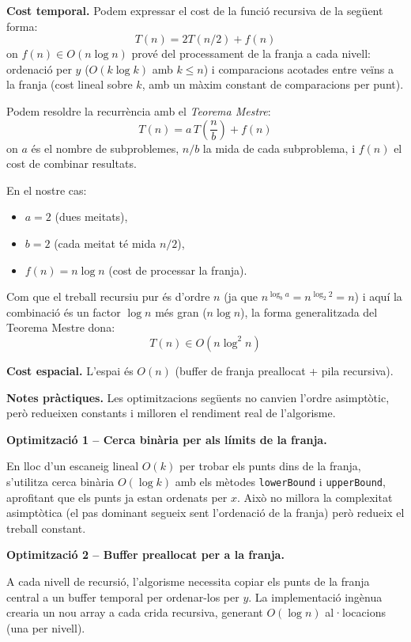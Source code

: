 \documentclass[conference,compsoc]{IEEEtran}
\begin{document}
\textbf{Cost temporal.}
Podem expressar el cost de la funció recursiva de la següent forma:
\begin{equation}
T(n)=2T(n/2)+f(n)
\end{equation}
on $f(n) \in O(n\log n)$ prové del processament de la franja a cada nivell:
ordenació per $y$ ($O(k\log k)$ amb $k \leq n$) i comparacions acotades entre veïns
a la franja (cost lineal sobre $k$, amb un màxim constant de comparacions
per punt).

Podem resoldre la recurrència amb el \textit{Teorema Mestre}:
\[
T(n)=a\,T\!\left(\frac{n}{b}\right)+f(n)
\]
on $a$ és el nombre de subproblemes, $n/b$ la mida de cada subproblema,
i $f(n)$ el cost de combinar resultats.

En el nostre cas:
\begin{itemize}
    \item $a=2$ (dues meitats),
    \item $b=2$ (cada meitat té mida $n/2$),
    \item $f(n)=n\log n$ (cost de processar la franja).
\end{itemize}

Com que el treball recursiu pur és d'ordre $n$ (ja que
$n^{\log_b a}=n^{\log_2 2}=n$) i aquí la combinació és un factor
$\log n$ més gran ($n\log n$), la forma generalitzada del Teorema
Mestre dona:
\[
T(n)\in O(n\log^2 n)
\]

\textbf{Cost espacial.} L'espai és
$O(n)$ (buffer de franja preallocat + pila recursiva).

\textbf{Notes pràctiques.} Les optimitzacions següents no canvien
l'ordre asimptòtic, però redueixen constants i milloren el rendiment
real de l'algorisme.

\textbf{Optimització 1 -- Cerca binària per als límits de la franja.}

En lloc d'un escaneig lineal $O(k)$ per trobar els punts dins de la
franja, s'utilitza cerca binària $O(\log k)$ amb els mètodes
\texttt{lowerBound} i \texttt{upperBound}, aprofitant que els punts
ja estan ordenats per $x$. Això no millora la complexitat
asimptòtica (el pas dominant segueix sent l'ordenació de la franja)
però redueix el treball constant.

\textbf{Optimització 2 -- Buffer preallocat per a la franja.}

A cada nivell de recursió, l'algorisme necessita copiar els punts
de la franja central a un buffer temporal per ordenar-los per $y$.
La implementació ingènua crearia un nou array a cada crida recursiva,
generant $O(\log n)$ al·locacions (una per nivell).
\end{document}
